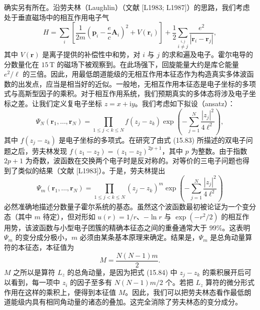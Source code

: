 确实另有所在。沿劳夫林（Laughlin）（文献 [L1983; L1987]）的思路，我们考虑处于垂直磁场中的相互作用电子气
\begin{equation*}
H=\sum_{i}\left[\frac{1}{2m}\left(\mathbf{p}_{i}-\frac{e}{c}\mathbf{A}_{i}\right)^{2}+V(\mathbf{r}_{i})\right]+\frac{1}{2}\sum_{\stackrel{i,j}{i\neq j}}\frac{e^{2}}{|\mathbf{r}_{i}-\mathbf{r}_{j}|},\tag{15.83}
\end{equation*}
其中 $V(\mathbf{r})$ 是离子提供的补偿性中和势，对 $i$ 与 $j$ 的求和遍及电子。霍尔电导的分数量化在 $15\,\mathrm{T}$ 的磁场下被观察到。在此场强下，回旋能量大约是库仑能量 $e^{2}/\ell$ 的三倍。因此，用最低朗道能级的无相互作用本征态作为构造真实多体波函数的出发点，应当是相当好的近似。一般地，无相互作用本征态是电子坐标的多项式与高斯型因子的乘积。对于相互作用系统，我们预期真实的多体态将涉及电子坐标之差。让我们定义复电子坐标 $z=x+\mathrm{i}y$。我们考虑如下拟设（ansatz）：
\begin{equation*}
\Psi_{N}(\mathbf{r}_{1},\ldots,\mathbf{r}_{N})=\prod_{1\le j<k\le N}f(z_{j}-z_{k})\exp\left(-\sum_{j=1}^{N}\frac{|z_{j}|^{2}}{4\ell^{2}}\right),\tag{15.84}
\end{equation*}
其中 $f(z_{j}-z_{k})$ 是电子坐标的多项式。在研究了由式 (15.83) 所描述的双电子问题之后，劳夫林发现 $f(z_{1}-z_{2})=(z_{1}-z_{2})^{2p+1}$，其中 $p$ 为整数。由于指数 $2p+1$ 为奇数，波函数在交换两个电子时是反对称的。对等价的三电子问题也得到了类似的结果（文献 [L1983]）。于是，劳夫林提出
\begin{equation*}
\Psi_{m}(\mathbf{r}_{1},\ldots,\mathbf{r}_{N})=\prod_{1\le j<k\le N}(z_{j}-z_{k})^{m}\exp\left(-\sum_{j=1}^{N}\frac{|z_{j}|^{2}}{4\ell^{2}}\right)\tag{15.85}
\end{equation*}
必然准确地描述分数量子霍尔系统的基态。虽然这个波函数最初被论证为一个变分态（其中 $m$ 待定），但对形如 $u(r)=1/r$、$-\ln r$ 与 $\exp(-r^{2}/2)$ 的相互作用势，该波函数与小型电子团簇的精确本征态之间的重叠通常大于 $99\%$。这表明 $\Psi_{m}$ 的变分成分极小，$m$ 必须由某条基本原理来确定。结果是，$\Psi_{m}$ 是总角动量算符的本征态，本征值为
\begin{equation*}
M=\frac{N(N-1)m}{2}.\tag{15.86}
\end{equation*}
$M$ 之所以是算符 $L_{z}$ 的总角动量，是因为把式 (15.84) 中 $z_{j}-z_{k}$ 的乘积展开后可以看到，每一项中 $z_{i}$ 的因子至多有 $N(N-1)m/2$ 个。若把 $L_{z}$ 算符的微分形式作用在这样的乘积上，便得到本征值 $M$。因此，我们可以把劳夫林态看作最低朗道能级内具有相同角动量的诸态的叠加。这完全消除了劳夫林态的变分成分。

